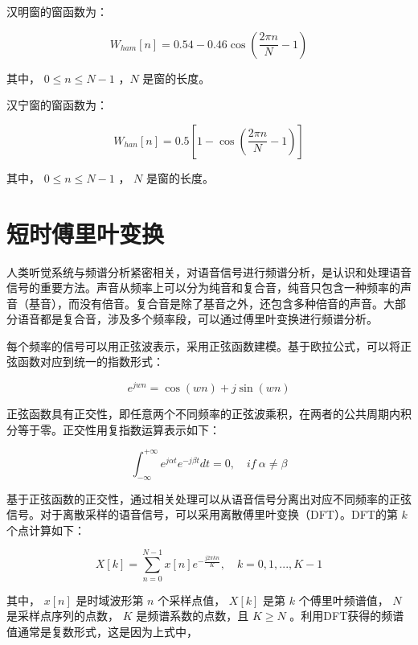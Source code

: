 \documentclass[cn,10pt,math=newtx,citestyle=gb7714-2015,bibstyle=gb7714-2015]{elegantbook}
\begin{document}
汉明窗的窗函数为：

\begin{equation}
  W_{ham}[n]=0.54-0.46\mathop{cos}(\frac{2\pi n}{N}-1)
\end{equation}

其中， $0\leq n\leq N-1$ ，$N$ 是窗的长度。

汉宁窗的窗函数为：

\begin{equation}
  W_{han}[n]=0.5[1-\mathop{cos}(\frac{2\pi n}{N}-1)]
\end{equation}

其中， $0\leq n\leq N-1$ ， $N$ 是窗的长度。

\section{短时傅里叶变换}

人类听觉系统与频谱分析紧密相关，对语音信号进行频谱分析，是认识和处理语音信号的重要方法。声音从频率上可以分为纯音和复合音，纯音只包含一种频率的声音（基音），而没有倍音。复合音是除了基音之外，还包含多种倍音的声音。大部分语音都是复合音，涉及多个频率段，可以通过傅里叶变换进行频谱分析。

每个频率的信号可以用正弦波表示，采用正弦函数建模。基于欧拉公式，可以将正弦函数对应到统一的指数形式：

\begin{equation}
  e^{jwn}=\mathop{cos}(wn)+j\mathop{sin}(wn)
\end{equation}

正弦函数具有正交性，即任意两个不同频率的正弦波乘积，在两者的公共周期内积分等于零。正交性用复指数运算表示如下：

\begin{equation}
  \int_{-\infty}^{+\infty}e^{j\alpha t}e^{-j\beta t}dt=0,\quad if\ \alpha\neq \beta
\end{equation}

基于正弦函数的正交性，通过相关处理可以从语音信号分离出对应不同频率的正弦信号。对于离散采样的语音信号，可以采用离散傅里叶变换（DFT）。DFT的第 $k$ 个点计算如下：

\begin{equation}
  X[k]=\sum_{n=0}^{N-1} x[n]e^{-\frac{j2\pi kn}{K}},\quad k=0,1,...,K-1
\end{equation}

其中， $x[n]$ 是时域波形第 $n$ 个采样点值， $X[k]$ 是第 $k$ 个傅里叶频谱值， $N$ 是采样点序列的点数， $K$ 是频谱系数的点数，且 $K\geq N$ 。利用DFT获得的频谱值通常是复数形式，这是因为上式中，
\end{document}

